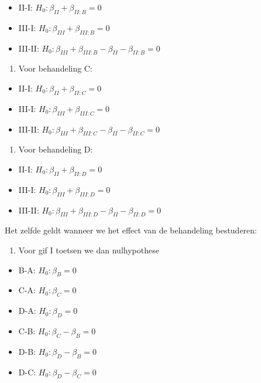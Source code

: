 \documentclass[
  12pt,dutch]{book}
\providecommand{\tightlist}{%
  \setlength{\itemsep}{0pt}\setlength{\parskip}{0pt}}
\theoremstyle{definition}
\theoremstyle{definition}
\theoremstyle{definition}
\theoremstyle{definition}
\theoremstyle{remark}
\begin{document}
\begin{itemize}
\tightlist
\item
  II-I: \(H_0: \beta_{II}+\beta_{II:B}=0\)
\item
  III-I: \(H_0: \beta_{III}+\beta_{III:B}=0\)
\item
  III-II: \(H_0: \beta_{III}+\beta_{III:B}-\beta_{II}-\beta_{II:B}=0\)
\end{itemize}

\begin{enumerate}
\def\labelenumi{\arabic{enumi}.}
\setcounter{enumi}{2}
\tightlist
\item
  Voor behandeling C:
\end{enumerate}

\begin{itemize}
\tightlist
\item
  II-I: \(H_0: \beta_{II}+\beta_{II:C}=0\)
\item
  III-I: \(H_0: \beta_{III}+\beta_{III:C}=0\)
\item
  III-II: \(H_0: \beta_{III}+\beta_{III:C}-\beta_{II}-\beta_{II:C}=0\)
\end{itemize}

\begin{enumerate}
\def\labelenumi{\arabic{enumi}.}
\setcounter{enumi}{3}
\tightlist
\item
  Voor behandeling D:
\end{enumerate}

\begin{itemize}
\tightlist
\item
  II-I: \(H_0: \beta_{II}+\beta_{II:D}=0\)
\item
  III-I: \(H_0: \beta_{III}+\beta_{III:D}=0\)
\item
  III-II: \(H_0: \beta_{III}+\beta_{III:D}-\beta_{II}-\beta_{II:D}=0\)
\end{itemize}

Het zelfde geldt wanneer we het effect van de behandeling bestuderen:

\begin{enumerate}
\def\labelenumi{\arabic{enumi}.}
\tightlist
\item
  Voor gif I toetsen we dan nulhypothese
\end{enumerate}

\begin{itemize}
\tightlist
\item
  B-A: \(H_0: \beta_{B}=0\)
\item
  C-A: \(H_0: \beta_{C}=0\)
\item
  D-A: \(H_0: \beta_{D}=0\)
\item
  C-B: \(H_0: \beta_{C}-\beta_{B}=0\)
\item
  D-B: \(H_0: \beta_{D}-\beta_{B}=0\)
\item
  D-C: \(H_0: \beta_{D}-\beta_{C}=0\)
\end{itemize}
\end{document}
